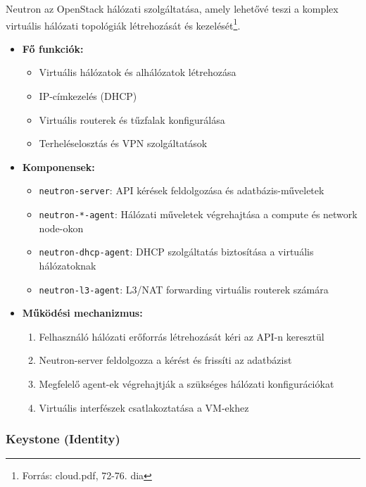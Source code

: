 \documentclass[a4paper,12pt]{article}
\begin{document}
    Neutron az OpenStack hálózati szolgáltatása, amely lehetővé teszi a komplex virtuális hálózati topológiák létrehozását és kezelését\footnote{Forrás: cloud.pdf, 72-76. dia}.

    \begin{itemize}
        \item \textbf{Fő funkciók:}
        \begin{itemize}
            \item Virtuális hálózatok és alhálózatok létrehozása
            \item IP-címkezelés (DHCP)
            \item Virtuális routerek és tűzfalak konfigurálása
            \item Terheléselosztás és VPN szolgáltatások
        \end{itemize}

        \item \textbf{Komponensek:}
        \begin{itemize}
            \item \texttt{neutron-server}: API kérések feldolgozása és adatbázis-műveletek
            \item \texttt{neutron-*-agent}: Hálózati műveletek végrehajtása a compute és network node-okon
            \item \texttt{neutron-dhcp-agent}: DHCP szolgáltatás biztosítása a virtuális hálózatoknak
            \item \texttt{neutron-l3-agent}: L3/NAT forwarding virtuális routerek számára
        \end{itemize}

        \item \textbf{Működési mechanizmus:}
        \begin{enumerate}
            \item Felhasználó hálózati erőforrás létrehozását kéri az API-n keresztül
            \item Neutron-server feldolgozza a kérést és frissíti az adatbázist
            \item Megfelelő agent-ek végrehajtják a szükséges hálózati konfigurációkat
            \item Virtuális interfészek csatlakoztatása a VM-ekhez
        \end{enumerate}
    \end{itemize}

    \subsubsection{Keystone (Identity)}
\end{document}
